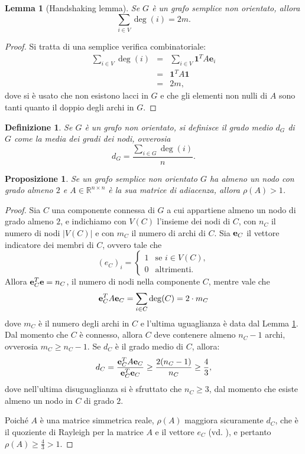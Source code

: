 \documentclass[a4paper]{article}
\newcommand{\RR}{\mathbb{R}}
\newcommand{\evec}{{\bf e}}
\newcommand{\bone}{\mathbf{1}}
\newcommand{\se}{\text{se }}
\newcommand{\altrimenti}{\text{altrimenti}}
\newtheorem{lemma}{Lemma}
\newtheorem{definition}{Definizione}
\newtheorem{proposition}{Proposizione}
\begin{document}
\begin{lemma}[Handshaking lemma]
    \label{lemma:handshake}
    Se $G$ è un grafo semplice non orientato, allora
    \[ \sum_{i \in V} \deg(i) = 2m. \]
\end{lemma}

\begin{proof}
    Si tratta di una semplice verifica combinatoriale:
    \begin{eqnarray}
        \sum_{i \in V} \deg(i)
        &=& \sum_{i \in V} \bone^T A \mathbf{e}_i \nonumber \\
        &=& \bone^T A \bone \nonumber \\
        &=& 2m, \nonumber
    \end{eqnarray}
    dove si è usato che non esistono lacci in $G$ e che gli elementi
    non nulli di $A$ sono tanti quanto il doppio degli archi in $G$.
\end{proof}

\begin{definition}
    Se $G$ è un grafo non orientato, si definisce {\rm il grado medio} $d_G$ di $G$ come
    la media dei gradi dei nodi, ovverosia
    \[
        d_G = \frac{\sum_{i \in G} \deg(i)}{n}.
    \]
\end{definition}

\begin{proposition}
    \label{prop:spectral_radius}
    Se un grafo semplice non orientato $G$ ha almeno un nodo con grado almeno $2$ e $A \in \RR^{n \times n}$ è la sua matrice di adiacenza, allora $\rho(A) > 1$.
\end{proposition}

\begin{proof}
    Sia $C$ una componente connessa di $G$ a cui appartiene almeno un nodo
    di grado almeno $2$, e indichiamo con $V(C)$ l'insieme dei nodi di $C$,
    con $n_C$ il numero di nodi $|V(C)|$ e con $m_C$ il numero di archi di $C$. Sia $\evec_C$ il vettore indicatore dei membri di $C$, ovvero tale che
    \[
        (e_C)_i = \begin{cases}
            1 & \se i \in V(C), \\
            0 & \altrimenti.
        \end{cases} 
    \]
    Allora $\evec_C^T \evec = n_C$, il numero di nodi nella componente $C$, mentre vale che
    \[
        \evec_C^T A \evec_C = \sum_{i \in C} \deg(C) = 2 \cdot m_C
    \]
    dove $m_C$ è il numero
    degli archi in $C$
    e l'ultima uguaglianza è data dal Lemma \ref{lemma:handshake}. Dal momento che $C$ è connesso, allora $C$ deve contenere almeno $n_C-1$ archi, ovverosia
    $m_C \geq n_C - 1$. Se $d_C$ è il grado medio di $C$, allora:
    \[
        d_C = \frac{\evec_C^T A \evec_C}{\evec_C^T \evec_C} \geq \frac{2(n_C-1)}{n_C} \geq \frac{4}{3},
    \]
    dove nell'ultima disuguaglianza si è sfruttato che $n_C \geq 3$, dal momento che
    esiste almeno un nodo in $C$ di grado $2$.

    Poiché $A$ è una matrice simmetrica reale, $\rho(A)$ maggiora
    sicuramente $d_C$, che è il
    quoziente di Rayleigh per la matrice $A$ e il vettore $e_C$ (vd. \cite[Theorem 4.4.2]{friedland2015}),
    e pertanto $\rho(A) \geq \frac{4}{3} > 1$.
\end{proof}
\end{document}
